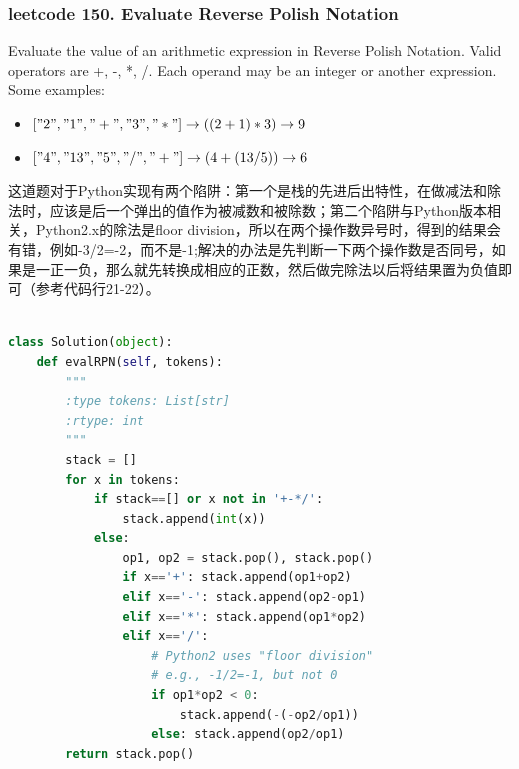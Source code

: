 \documentclass[a4paper,10pt]{article}
\begin{document}
\subsubsection{leetcode 150. Evaluate Reverse Polish Notation}
Evaluate the value of an arithmetic expression in Reverse Polish Notation. Valid operators are +, -, *, /. Each operand may be an integer or another expression. \\

\noindent Some examples:
\begin{itemize}
    \item $["2", "1", "+", "3", "*"] \to ((2 + 1) * 3) \to 9$
    \item $["4", "13", "5", "/", "+"] \to (4 + (13 / 5)) \to 6$
\end{itemize}
  
\begin{CJK*}{UTF8}{gbsn}
\noindent 这道题对于Python实现有两个陷阱：第一个是栈的先进后出特性，在做减法和除法时，应该是后一个弹出的值作为被减数和被除数；第二个陷阱与Python版本相关，Python2.x的除法是floor division，所以在两个操作数异号时，得到的结果会有错，例如-3/2=-2，而不是-1;解决的办法是先判断一下两个操作数是否同号，如果是一正一负，那么就先转换成相应的正数，然后做完除法以后将结果置为负值即可（参考代码行21-22）。
\end{CJK*}

\begin{lstlisting}[language=Python, caption=Problem150. Evaluate Reverse Polish Notation]

class Solution(object):
    def evalRPN(self, tokens):
        """
        :type tokens: List[str]
        :rtype: int
        """
        stack = []
        for x in tokens:
            if stack==[] or x not in '+-*/':
                stack.append(int(x))
            else:
                op1, op2 = stack.pop(), stack.pop()
                if x=='+': stack.append(op1+op2)
                elif x=='-': stack.append(op2-op1)
                elif x=='*': stack.append(op1*op2)
                elif x=='/':
                    # Python2 uses "floor division"
                    # e.g., -1/2=-1, but not 0
                    if op1*op2 < 0:
                        stack.append(-(-op2/op1))
                    else: stack.append(op2/op1)
        return stack.pop()
\end{lstlisting}



\end{document}
